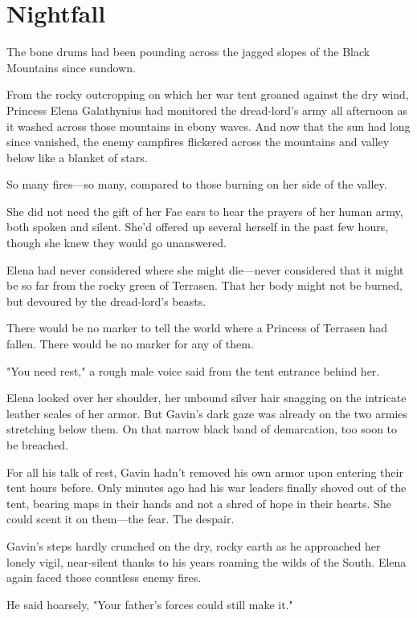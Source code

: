 
\chapter*{Nightfall}

The bone drums had been pounding across the jagged slopes of the Black Mountains since sundown.

From the rocky outcropping on which her war tent groaned against the dry wind, Princess Elena Galathynius had monitored the dread-lord's army all afternoon as it washed across those mountains in ebony waves.
And now that the sun had long since vanished, the enemy campfires flickered across the mountains and valley below like a blanket of stars.

So many fires---so many, compared to those burning on her side of the valley.

She did not need the gift of her Fae ears to hear the prayers of her human army, both spoken and silent.
She'd offered up several herself in the past few hours, though she knew they would go unanswered.

Elena had never considered where she might die---never considered that it might be so far from the rocky green of Terrasen.
That her body might not be burned, but devoured by the dread-lord's beasts.

There would be no marker to tell the world where a Princess of Terrasen had fallen.
There would be no marker for any of them.

"You need rest," a rough male voice said from the tent entrance behind her.

Elena looked over her shoulder, her unbound silver hair snagging on the intricate leather scales of her armor.
But Gavin's dark gaze was already on the two armies stretching below them.
On that narrow black band of demarcation, too soon to be breached.

For all his talk of rest, Gavin hadn't removed his own armor upon entering their tent hours before.
Only minutes ago had his war leaders finally shoved out of the tent, bearing maps in their hands and not a shred of hope in their hearts.
She could scent it on them---the fear.
The despair.

Gavin's steps hardly crunched on the dry, rocky earth as he approached her lonely vigil, near-silent thanks to his years roaming the wilds of the South.
Elena again faced those countless enemy fires.

He said hoarsely, "Your father's forces could still make it."

